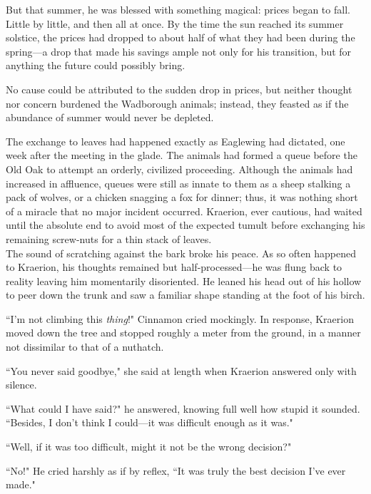 But that summer, he was blessed with something magical: prices began to fall.
Little by little, and then all at once.
By the time the sun reached its summer solstice, the prices had dropped to about half of what they had been during the spring---a drop that made his savings ample not only for his transition, but for anything the future could possibly bring.

No cause could be attributed to the sudden drop in prices, but neither thought nor concern burdened the Wadborough animals; instead, they feasted as if the abundance of summer would never be depleted.%

The exchange to leaves had happened exactly as Eaglewing had dictated, one week after the meeting in the glade.
The animals had formed a queue before the Old Oak to attempt an orderly, civilized proceeding.
Although the animals had increased in affluence, queues were still as innate to them as a sheep stalking a pack of wolves, or a chicken snagging a fox for dinner; thus, it was nothing short of a miracle that no major incident occurred.
Kraerion, ever cautious, had waited until the absolute end to avoid most of the expected tumult before exchanging his remaining screw-nuts for a thin stack of leaves.\\

The sound of scratching against the bark broke his peace. %
As so often happened to Kraerion, his thoughts remained but half-processed---he was flung back to reality leaving him momentarily disoriented.
He leaned his head out of his hollow to peer down the trunk and saw a familiar shape standing at the foot of his birch.

\renewcommand*{\thepage}{\footnotesize \arabic{page}}

``I'm not climbing this \textit{thing}!" Cinnamon cried mockingly.
In response, Kraerion moved down the tree and stopped roughly a meter from the ground, in a manner not dissimilar to that of a nuthatch.

``You never said goodbye," she said at length when Kraerion answered only with silence.

``What could I have said?" he answered, knowing full well how stupid it sounded. ``Besides, I don't think I could---it was difficult enough as it was."

``Well, if it was too difficult, might it not be the wrong decision?"

``No!" He cried harshly as if by reflex, ``It was truly the best decision I've ever made."

